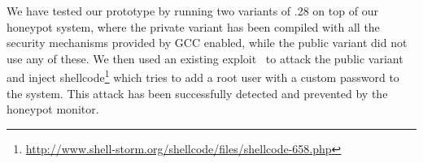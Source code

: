 We have tested our prototype by running two variants of .28 on
top of our honeypot system, where the private variant has been compiled with
all the security mechanisms provided by GCC enabled, while the public variant
did not use any of these.
We then used an existing exploit~\cite{erickson:hacking-networking} to attack the public variant and
inject shellcode\footnote{\url{http://www.shell-storm.org/shellcode/files/shellcode-658.php}}
which tries to add a root user with a custom password to the system. This
attack has been successfully detected and prevented by the honeypot monitor.
